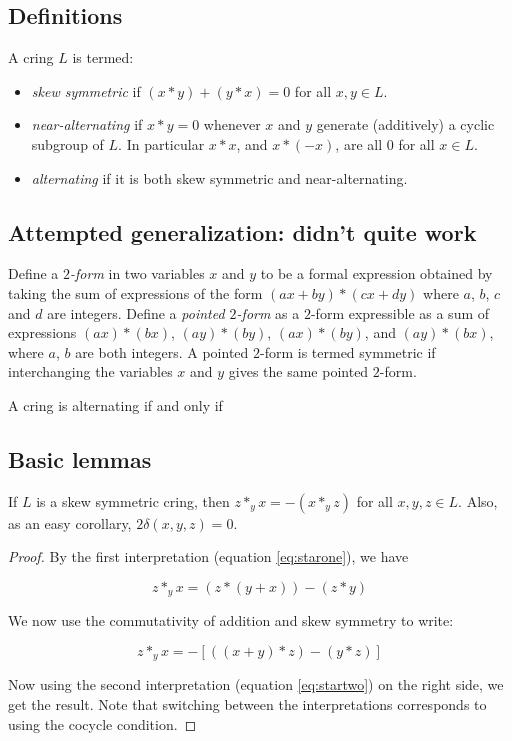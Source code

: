 \documentclass[10pt]{amsart}
\begin{document}
\subsection{Definitions}

A cring $L$ is termed:

\begin{itemize}
\item {\em skew symmetric} if $(x * y) + (y * x) = 0$ for all $x,y \in
L$.
\item {\em near-alternating} if $x * y = 0$ whenever $x$ and $y$
  generate (additively) a cyclic subgroup of $L$. In particular $x *
  x$, and $x * (-x)$, are all $0$ for all $x \in L$.
\item {\em alternating} if it is both skew symmetric and
  near-alternating.
\end{itemize}

\subsection{Attempted generalization: didn't quite work}

Define a {\em $2$-form} in two variables $x$ and $y$ to be a formal
expression obtained by taking the sum of expressions of the form $(ax
+ by) * (cx + dy)$ where $a$, $b$, $c$ and $d$ are integers. Define a
{\em pointed $2$-form} as a $2$-form expressible as a sum of
expressions $(ax) * (bx)$, $(ay) * (by)$, $(ax) * (by)$, and $(ay) *
(bx)$, where $a$, $b$ are both integers. A pointed $2$-form is termed
symmetric if interchanging the variables $x$ and $y$ gives the same
pointed $2$-form.

A cring is alternating if and only if 
\subsection{Basic lemmas}

\begin{lemma}
  If $L$ is a skew symmetric cring, then $z *_y x = -(x *_y z)$ for
  all $x,y,z \in L$. Also, as an easy corollary, $2\delta(x,y,z) = 0$.
\end{lemma}

\begin{proof}
  By the first interpretation (equation \ref{eq:starone}), we have

  \begin{equation*}
    z *_y x = (z * (y + x)) - (z * y)
  \end{equation*}

  We now use the commutativity of addition and skew symmetry to write:

  \begin{equation*}
    z *_y x = -[((x + y) * z) - (y * z)]
  \end{equation*}

  Now using the second interpretation (equation \ref{eq:startwo}) on
  the right side, we get the result. Note that switching between the
  interpretations corresponds to using the cocycle condition.
\end{proof}
\end{document}
